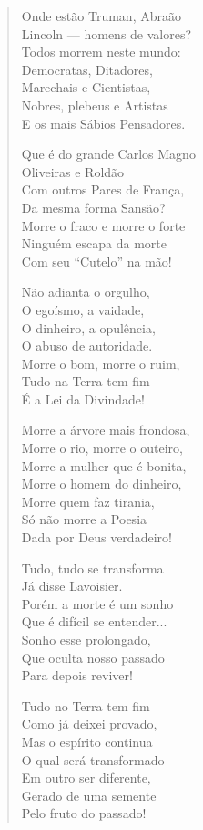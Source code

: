 \begin{verse}
Onde estão Truman, Abraão \\
Lincoln ---  homens de valores? \\
Todos morrem neste mundo: \\
Democratas, Ditadores, \\
Marechais e Cientistas, \\
Nobres, plebeus e Artistas \\
E os mais Sábios Pensadores. 


Que é do grande Carlos Magno \\
Oliveiras e Roldão \\
Com outros Pares de França, \\
Da mesma forma Sansão? \\
Morre o fraco e morre o forte \\
Ninguém escapa da morte \\
Com seu ``Cutelo'' na mão! 

Não adianta o orgulho, \\
O egoísmo, a vaidade, \\
O dinheiro, a opulência, \\
O abuso de autoridade. \\
Morre o bom, morre o ruim, \\
Tudo na Terra tem fim \\
É a Lei da Divindade! 

Morre a árvore mais frondosa, \\
Morre o rio, morre o outeiro, \\
Morre a mulher que é bonita, \\
Morre o homem do dinheiro, \\
Morre quem faz tirania, \\
Só não morre a Poesia \\
Dada por Deus verdadeiro! 

Tudo, tudo se transforma \\
Já disse Lavoisier. \\
Porém a morte é um sonho \\
Que é difícil se entender... \\
Sonho esse prolongado, \\
Que oculta nosso passado \\
Para depois reviver! 


Tudo no Terra tem fim \\
Como já deixei provado, \\
Mas o espírito continua \\
O qual será transformado \\
Em outro ser diferente, \\
Gerado de uma semente \\
Pelo fruto do passado! 


\end{verse}
